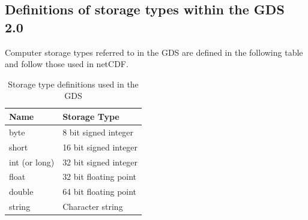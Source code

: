 \subsection{Definitions of storage types within the GDS 2.0}
Computer storage types referred to in the GDS are defined in the following table and follow those used in
netCDF.

\begin{table}[h]
\centering
\caption{Storage type definitions used in the GDS}
\label{tab:storage-definitions}
\begin{tabular}{|l|l|}
\hline
\rowcolor{lightgray} \textbf{Name} & \textbf{Storage Type}\\
\hline
byte & 8 bit signed integer\\
\hline
short & 16 bit signed integer\\
\hline
int (or long) & 32 bit signed integer\\
\hline
float & 32 bit floating point\\
\hline
double & 64 bit floating point\\
\hline
string & Character string\\
\hline
\end{tabular}
\end{table}
